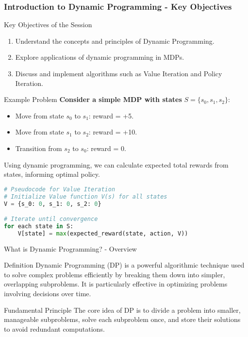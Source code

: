 \documentclass[aspectratio=169]{beamer}
\begin{document}
\begin{frame}[fragile]
    \frametitle{Introduction to Dynamic Programming - Key Objectives}
    \begin{block}{Key Objectives of the Session}
        \begin{enumerate}
            \item Understand the concepts and principles of Dynamic Programming.
            \item Explore applications of dynamic programming in MDPs.
            \item Discuss and implement algorithms such as Value Iteration and Policy Iteration.
        \end{enumerate}
    \end{block}
    
    \begin{block}{Example Problem}
        \textbf{Consider a simple MDP with states} $S = \{s_0, s_1, s_2\}$:
        \begin{itemize}
            \item Move from state $s_0$ to $s_1$: reward = +5.
            \item Move from state $s_1$ to $s_2$: reward = +10.
            \item Transition from $s_2$ to $s_0$: reward = 0.
        \end{itemize}
        Using dynamic programming, we can calculate expected total rewards from states, informing optimal policy.
    \end{block}

    \begin{lstlisting}[language=Python]
# Pseudocode for Value Iteration
# Initialize Value function V(s) for all states
V = {s_0: 0, s_1: 0, s_2: 0} 

# Iterate until convergence
for each state in S:
    V[state] = max(expected_reward(state, action, V))
    \end{lstlisting}
\end{frame}

\begin{frame}[fragile]{What is Dynamic Programming? - Overview}
    \begin{block}{Definition}
        Dynamic Programming (DP) is a powerful algorithmic technique used to solve complex problems efficiently by breaking them down into simpler, overlapping subproblems. It is particularly effective in optimizing problems involving decisions over time.
    \end{block}
    
    \begin{block}{Fundamental Principle}
        The core idea of DP is to divide a problem into smaller, manageable subproblems, solve each subproblem once, and store their solutions to avoid redundant computations.
    \end{block}
\end{frame}
\end{document}
